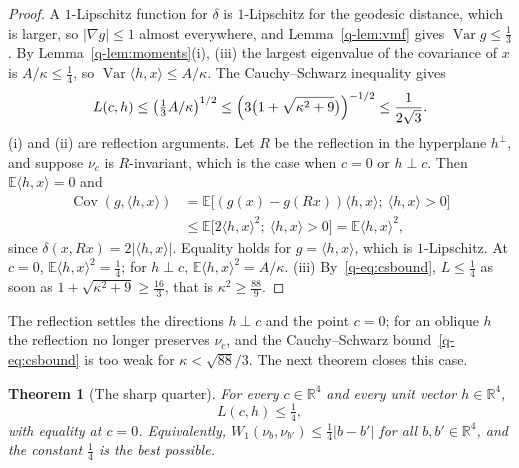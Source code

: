 \documentclass[11pt]{amsart}
\newtheorem{theorem}{Theorem}[section]
\theoremstyle{definition}
\theoremstyle{remark}
\numberwithin{equation}{section}
\newcommand{\R}{\mathbb{R}}
\newcommand{\E}{\mathbb{E}}
\newcommand{\Cov}{\operatorname{Cov}}
\newcommand{\Var}{\operatorname{Var}}
\newcommand{\ip}[2]{\langle #1,#2\rangle}
\begin{document}
\begin{proof}
A $1$-Lipschitz function for $\delta$ is $1$-Lipschitz for the geodesic
distance, which is larger, so $|\nabla g|\le1$ almost everywhere, and
Lemma~\ref{q-lem:vmf} gives $\Var g\le\frac13$. By Lemma~\ref{q-lem:moments}(i),
(iii) the largest eigenvalue of the covariance of $x$ is $A/\kappa\le\frac14$,
so $\Var\ip hx\le A/\kappa$. The Cauchy--Schwarz inequality gives
\begin{equation}\label{q-eq:csbound}
L(c,h)\le\bigl(\tfrac13A/\kappa\bigr)^{1/2}\le\Bigl(3\bigl(1+
\sqrt{\kappa^2+9}\bigr)\Bigr)^{-1/2}\le\frac1{2\sqrt3}.
\end{equation}
(i) and (ii) are reflection arguments. Let $R$ be the reflection in the
hyperplane $h^\perp$, and suppose $\nu_c$ is $R$-invariant, which is the case
when $c=0$ or $h\perp c$. Then $\E\ip hx=0$ and
\[
\begin{aligned}
\Cov(g,\ip hx)&=\E\bigl[(g(x)-g(Rx))\ip hx;\ \ip hx>0\bigr]\\
&\le\E\bigl[2\ip hx^2;\ \ip hx>0\bigr]=\E\ip hx^2,
\end{aligned}
\]
since $\delta(x,Rx)=2|\ip hx|$. Equality holds for $g=\ip hx$, which is
$1$-Lipschitz. At $c=0$, $\E\ip hx^2=\frac14$; for $h\perp c$, $\E\ip
hx^2=A/\kappa$. (iii) By~\eqref{q-eq:csbound}, $L\le\frac14$ as soon as
$1+\sqrt{\kappa^2+9}\ge\frac{16}3$, that is $\kappa^2\ge\frac{88}9$.
\end{proof}

The reflection settles the directions
$h\perp c$ and the point $c=0$; for an oblique $h$ the reflection no longer
preserves $\nu_c$, and the Cauchy--Schwarz bound~\eqref{q-eq:csbound} is too
weak for $\kappa<\sqrt{88}/3$. The next theorem closes this case.

\begin{theorem}[The sharp quarter]\label{q-thm:quarter}
For every $c\in\R^4$ and every unit vector $h\in\R^4$,
\[
L(c,h)\le\tfrac14 ,
\]
with equality at $c=0$. Equivalently, $W_1(\nu_b,\nu_{b'})\le\frac14|b-b'|$
for all $b,b'\in\R^4$, and the constant $\frac14$ is the best possible.
\end{theorem}
\end{document}
